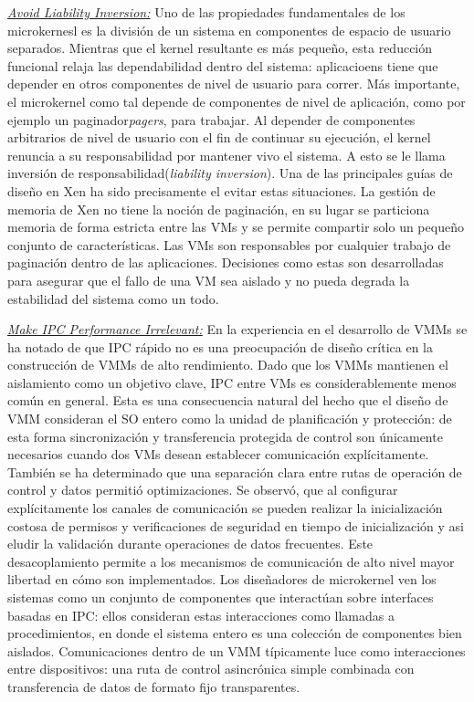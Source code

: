 \underline{\emph{Avoid Liability Inversion:}} Uno de las propiedades fundamentales de los microkernesl es la división de un sistema en componentes de espacio de usuario separados. Mientras que el kernel resultante es más pequeño, esta reducción funcional relaja las dependabilidad dentro del sistema:  aplicacioens tiene que depender en otros componentes de nivel de usuario para correr. Más importante, el microkernel como tal depende de componentes de nivel de aplicación, como por ejemplo un paginador\emph{pagers}, para trabajar. Al depender de componentes arbitrarios de nivel de usuario con el fin de continuar su ejecución, el kernel renuncia a su responsabilidad por mantener vivo el sistema. A esto se le llama inversión de responsabilidad(\emph{liability inversion}). Una de las principales guías de diseño en Xen ha sido precisamente el evitar estas situaciones. La gestión de memoria de Xen no tiene la noción de paginación, en su lugar se particiona memoria de forma estricta entre las VMs y se permite compartir solo un pequeño conjunto de características. Las VMs son responsables por cualquier trabajo de paginación dentro de las aplicaciones. Decisiones como estas son desarrolladas para asegurar que el fallo de una VM sea aislado y no pueda degrada la estabilidad del sistema como un todo.

\underline{\emph{Make IPC Performance Irrelevant:}}
En la experiencia en el desarrollo de VMMs se ha notado de que IPC rápido no es una preocupación de diseño crítica en la construcción de VMMs de alto rendimiento. Dado que los VMMs mantienen el aislamiento como un objetivo clave, IPC entre VMs es considerablemente menos común en general. Esta es una consecuencia natural del hecho que el diseño de VMM consideran el SO entero como la unidad de planificación y protección: de esta forma sincronización y transferencia protegida de control son únicamente necesarios cuando dos VMs desean establecer comunicación explícitamente. También se ha determinado que una separación clara entre rutas de operación de control y datos permitió optimizaciones. Se observó, que al configurar explícitamente los canales de comunicación se pueden realizar la inicialización costosa de permisos y verificaciones de seguridad en tiempo de inicialización y asi eludir la validación durante operaciones de datos frecuentes. Este desacoplamiento permite a los mecanismos de comunicación de alto nivel mayor libertad en cómo son implementados. Los diseñadores de microkernel ven los sistemas como un conjunto de componentes que interactúan sobre interfaces basadas en IPC: ellos consideran estas interacciones como llamadas a procedimientos, en donde el sistema entero es una colección de componentes bien aislados. Comunicaciones dentro de un VMM típicamente luce como interacciones entre dispositivos: una ruta de control asincrónica simple combinada con transferencia de datos de formato fijo transparentes.

